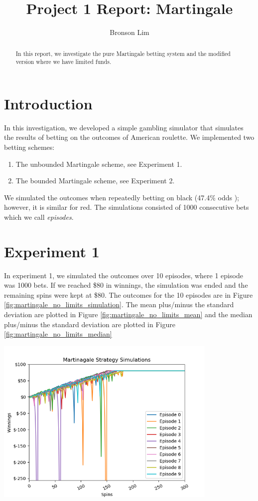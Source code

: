 \documentclass[
	letterpaper, %
]{jdf}
\author{Bronson Lim}
\title{Project 1 Report: Martingale}
\begin{document}

\maketitle


\begin{abstract}
	In this report, we investigate the pure Martingale betting system and the modified version where we have limited funds.
\end{abstract}

\section{Introduction}
In this investigation, we developed a simple gambling simulator that simulates the results of betting on the outcomes of
American roulette. We implemented two betting schemes:
\begin{enumerate}
	\item The unbounded Martingale scheme, see Experiment 1.
	\item The bounded Martingale scheme, see Experiment 2.
\end{enumerate}
We simulated the outcomes when repeatedly betting on black (47.4\% odds \cite{wiki:Roulette}); however, it is similar for red. The simulations consisted of
1000 consecutive bets which we call \textit{episodes}.

\section{Experiment 1}

In experiment 1, we simulated the outcomes over 10 episodes, where 1 episode was 1000 bets. If we reached \$80 in winnings, the simulation was ended and the remaining
spins were kept at \$80. The outcomes for the 10 episodes are in Figure \ref{fig:martingale_no_limits_simulation}. The mean plus/minus the standard deviation
are plotted in Figure \ref{fig:martingale_no_limits_mean} and the median plus/minus the standard deviation are plotted in Figure \ref{fig:martingale_no_limits_median}

\begin{jdffigure}
\includegraphics[height=8cm]{../../martingale/martingale_no_limits_simulation.png}
\label{fig:martingale_no_limits_simulation}
\end{jdffigure}
\end{document}
